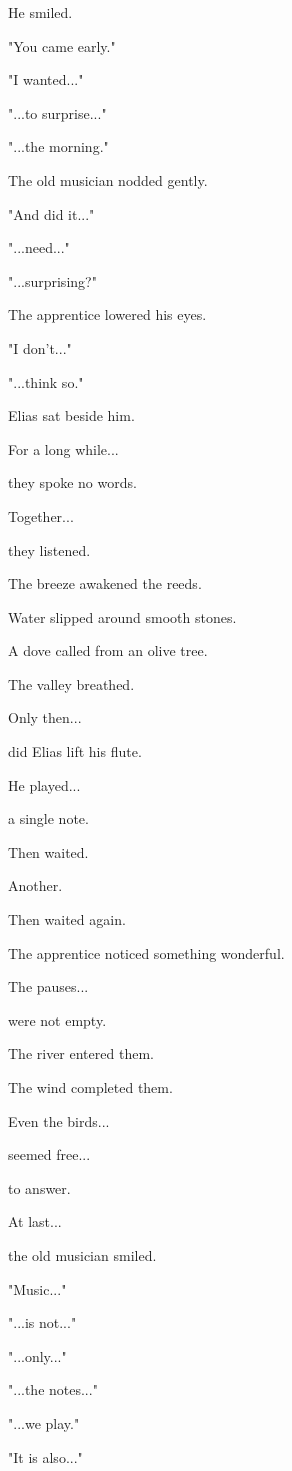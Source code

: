 \documentclass[12pt,openany]{book}
\begin{document}
He smiled.

"You came early."

"I wanted..."

"...to surprise..."

"...the morning."

The old musician nodded gently.

"And did it..."

"...need..."

"...surprising?"

The apprentice lowered his eyes.

"I don't..."

"...think so."

Elias sat beside him.

For a long while...

they spoke no words.

Together...

they listened.

The breeze awakened the reeds.

Water slipped around smooth stones.

A dove called from an olive tree.

The valley breathed.

Only then...

did Elias lift his flute.

He played...

a single note.

Then waited.

Another.

Then waited again.

The apprentice noticed something wonderful.

The pauses...

were not empty.

The river entered them.

The wind completed them.

Even the birds...

seemed free...

to answer.

At last...

the old musician smiled.

"Music..."

"...is not..."

"...only..."

"...the notes..."

"...we play."

"It is also..."
\end{document}
